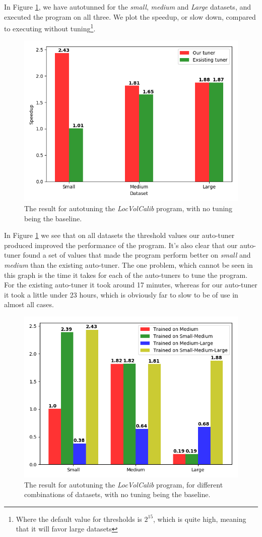 In Figure \ref{LocVolCalib-SmallMediumLarge}, we have autotunned for the
\textit{small}, \textit{medium} and \textit{Large} datasets, and executed the program on all
three. We plot the speedup, or slow down, compared to executing without
tuning\footnote{Where the default value for thresholds is $2^{15}$, which is
quite high, meaning that it will favor large datasets}.
\begin{figure}[h]
	\centering
	\includegraphics[width=.7\textwidth]{../benchmarks/LocVolCalib.png}
  \caption{The result for autotuning the \textit{LocVolCalib} program, with no tuning being the baseline.}
	\label{LocVolCalib-SmallMediumLarge}
\end{figure}
In Figure \ref{LocVolCalib-SmallMediumLarge} we see that on all datasets the
threshold values our auto-tuner produced improved the performance of the
program. It's also clear that our auto-tuner found a set of values that made
the program perform better on \textit{small} and \textit{medium} than the
existing auto-tuner. The one problem, which cannot be seen in this graph is the
time it takes for each of the auto-tuners to tune the program. For the existing
auto-tuner it took around 17 minutes, whereas for our auto-tuner it took a
little under 23 hours, which is obviously far to slow to be of use in almost
all cases. 

\begin{figure}[H]
	\centering
	\includegraphics[width=.7\textwidth]{../benchmarks/LocVolCalibAll.png}
  \caption{The result for autotuning the \textit{LocVolCalib} program, for different combinations of datasets, with no tuning being the baseline.}
	\label{LocVolCalibAll}
\end{figure}

